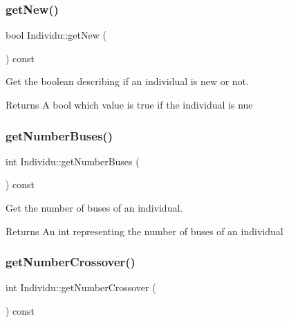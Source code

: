 \subsubsection{\texorpdfstring{get\+New()}{getNew()}}
{\footnotesize\ttfamily bool Individu\+::get\+New (\begin{DoxyParamCaption}{ }\end{DoxyParamCaption}) const}



Get the boolean describing if an individual is new or not. 

\begin{DoxyReturn}{Returns}
A bool which value is true if the individual is nue 
\end{DoxyReturn}
\mbox{\label{class_individu_a33a6c22bc7e08d2fe32664be076b3957}} 
\subsubsection{\texorpdfstring{get\+Number\+Buses()}{getNumberBuses()}}
{\footnotesize\ttfamily int Individu\+::get\+Number\+Buses (\begin{DoxyParamCaption}{ }\end{DoxyParamCaption}) const}



Get the number of buses of an individual. 

\begin{DoxyReturn}{Returns}
An int representing the number of buses of an individual 
\end{DoxyReturn}
\mbox{\label{class_individu_ac2b0760ade1996c858f847ce9c176c20}} 
\subsubsection{\texorpdfstring{get\+Number\+Crossover()}{getNumberCrossover()}}
{\footnotesize\ttfamily int Individu\+::get\+Number\+Crossover (\begin{DoxyParamCaption}{ }\end{DoxyParamCaption}) const}



